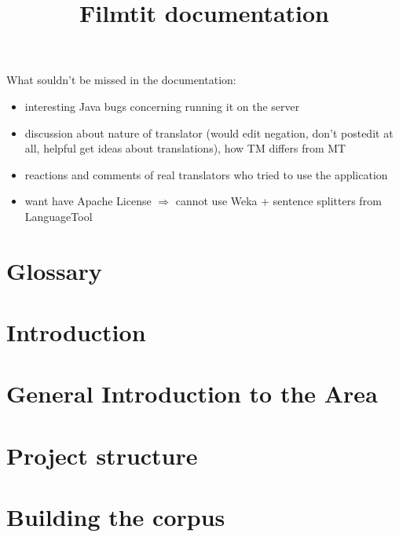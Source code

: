 \documentclass[11pt, oneside]{book}
\title{Filmtit documentation}
\author{}
\begin{document}

{\huge What souldn't be missed in the documentation:
\begin{itemize}
\item interesting Java bugs concerning running it on the server

\item discussion about nature of translator (would edit negation, don't postedit at all, helpful get ideas about translations), how TM differs from MT

\item reactions and comments of real translators who tried to use the application

\item want have Apache License $\Rightarrow$ cannot use Weka + sentence splitters from LanguageTool
\end{itemize}
}

\newpage


\tableofcontents
\sloppy

\newpage

\setcounter{page}{1}

\chapter*{Glossary}



\chapter{Introduction}


\chapter{General Introduction to the Area}


\chapter{Project structure}


%

\chapter{Building the corpus}

\end{document}
